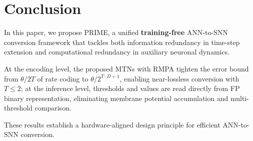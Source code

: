 \section{Conclusion}

In this paper, we propose PRIME, a unified \textbf{training-free} ANN-to-SNN conversion framework that tackles both information redundancy in time-step extension and computational redundancy in auxiliary neuronal dynamics.

At the encoding level, the proposed MTNs with RMPA tighten the error bound from $\theta/2T$ of rate coding to $\theta/2^{T \cdot D+1}$, enabling near-lossless conversion with $T \leq 2$; 
at the inference level, thresholds and values are read directly from FP binary representation, eliminating membrane potential accumulation and multi-threshold comparison.

These results establish a hardware-aligned design principle for efficient ANN-to-SNN conversion.








